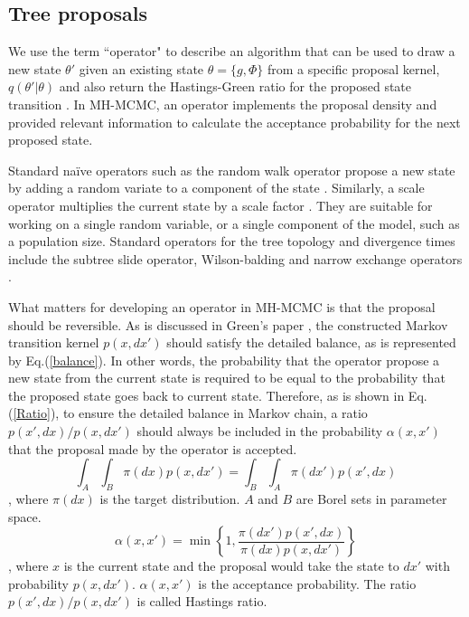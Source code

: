 \documentclass{bmcart}
\begin{document}
\subsection*{Tree proposals}
\label{treeproposals}
We use the term ``operator" to describe an algorithm that can be used to draw a new state $\theta'$ given an existing state $\theta = \{g,\Phi\}$ from a specific proposal kernel, $q(\theta'|\theta)$ and also return the Hastings-Green ratio for the proposed state transition \cite{}. In MH-MCMC, an operator implements the proposal density and provided relevant information to calculate the acceptance probability for the next proposed state. 

Standard na\"{i}ve operators such as the random walk operator propose a new state by adding a random variate to a component of the state \cite{suchard2005stochastic}. 
Similarly, a scale operator multiplies the current state by a scale factor \cite{higuchi1997monte}. They are suitable for working on a single random variable, or a single component of the model, such as a population size. 
Standard operators for the tree topology and divergence times include the subtree slide operator, Wilson-balding and narrow exchange operators \cite{hohna2008clock}. 

What matters for developing an operator in MH-MCMC is that the proposal should be reversible. As is discussed in Green's paper \cite{green1995reversible}, the constructed Markov transition kernel $p(x,dx')$ should satisfy the detailed balance, as is represented by Eq.(\ref{balance}). In other words, the probability that the operator propose a new state from the current state is required to be equal to the probability that the proposed state goes back to current state. Therefore, as is shown in Eq.(\ref{Ratio}), to ensure the detailed balance in Markov chain, a ratio ${p(x',dx)}/{p(x,dx')}$ should always be included in the probability $\alpha(x,x')$ that the proposal made by the operator is accepted.
\begin{equation}\label{balance}
\int_A {\int_B {\pi (dx)p(x,dx')} }  = \int_B {\int_A {\pi (dx')p(x',dx)} }
\end{equation}
, where ${\pi (dx)}$ is the target distribution. $A$ and $B$ are Borel sets in parameter space.
\begin{equation}\label{Ratio}
{\alpha}(x,x') = \min \left\{ {1,\frac{{\pi (dx'){p}(x',dx)}}{{\pi (dx){p}(x,dx')}}} \right\}
\end{equation}
, where $x$ is the current state and the proposal would take the state to $dx'$ with probability ${p(x,dx')}$. ${\alpha}(x,x')$ is the acceptance probability. The ratio ${p(x',dx)}/{p(x,dx')}$ is called Hastings ratio.
\end{document}

